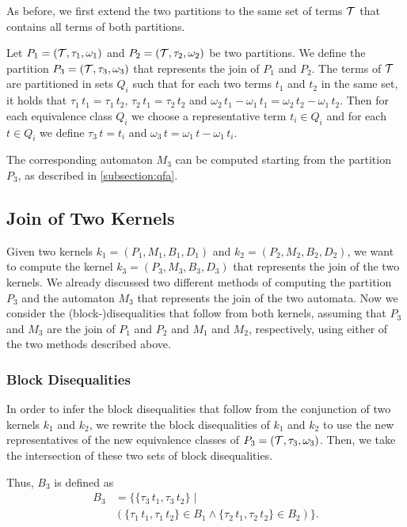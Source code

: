 As before, we first extend the two partitions to the same set of terms $\mathcal{T}$ that contains all terms of both partitions.

Let $P_1 = (\mathcal{T}, \tau_1, \omega_1)$ and $P_2 = (\mathcal{T}, \tau_2, \omega_2)$ be two partitions.
We define the partition $P_3 = (\mathcal{T}, \tau_3, \omega_3)$ that represents the join of $P_1$ and $P_2$.
The terms of $\mathcal{T}$ are partitioned in sets $Q_i$ such that for each two terms $t_1$ and $t_2$ in the same set, it holds that $\tau_1\,t_1 = \tau_1\,t_2$, $\tau_2\,t_1 = \tau_2\,t_2$ and $\omega_2\,t_1 -\omega_1\,t_1 = \omega_2\,t_2 - \omega_1\,t_2$.
Then for each equivalence class $Q_i$ we choose a representative term $t_i\in Q_i$ and
for each $t \in Q_i$ we define $\tau_3\,t = t_i$ and $\omega_3\,t = \omega_1\,t - \omega_1\,t_i$.

The corresponding automaton $M_3$ can be computed starting from the partition $P_3$,
as described in \cref{subsection:qfa}.

\subsection{Join of Two Kernels}

Given two kernels $k_1 = (P_1, M_1,B_1, D_1)$ and $k_2 = (P_2, M_2,B_2, D_2)$, we want to compute the kernel $k_3 = (P_3, M_3,B_3, D_3)$ that represents the join of the two kernels.
We already discussed two different methods of computing the partition $P_3$ and the automaton $M_3$ that represents the join of the two automata.
Now we consider the (block-)disequalities that follow from both kernels,
assuming that $P_3$ and $M_3$ are the join of $P_1$ and $P_2$ and $M_1$ and $M_2$, respectively,
using either of the two methods described above.

\subsubsection{Block Disequalities}

In order to infer the block disequalities that follow from the conjunction of two kernels $k_1$ and $k_2$,
we rewrite the block disequalities of $k_1$ and $k_2$ to use the new representatives of the new equivalence classes of $P_3 = (\mathcal{T}, \tau_3, \omega_3)$.
Then, we take the intersection of these two sets of block disequalities.

Thus, $B_3$ is defined as
\[
    \begin{array}{ll}
        B_3 & = \{\{\tau_3\,t_1, \tau_3\,t_2\}  \mid                                                \\
            & (\{\tau_1\,t_1, \tau_1\,t_2\} \in B_1 \land \{\tau_2\,t_1, \tau_2\,t_2\} \in B_2) \}.
    \end{array}
\]

